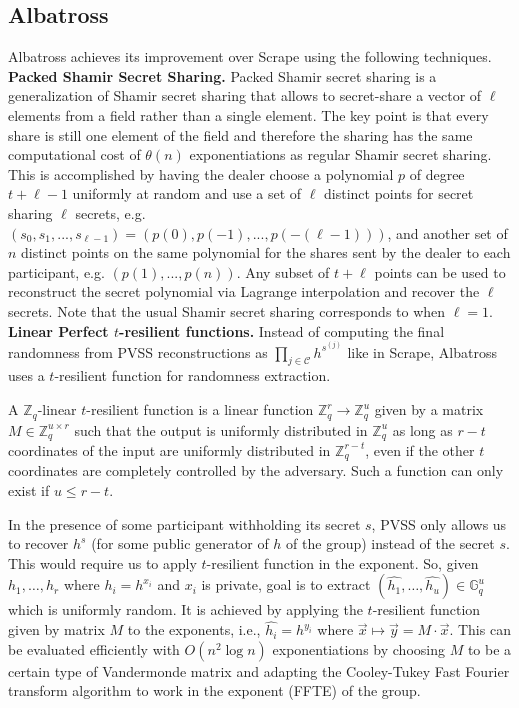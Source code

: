 \documentclass[letterpaper,twocolumn,10pt]{article}
\theoremstyle{definition}
\theoremstyle{remark}
\begin{document}
\iffalse
\subsection{Albatross}
\label{appendix:albatross}
Albatross \cite{cascudo2020albatross} achieves its improvement over Scrape using the following techniques.\\

\noindent\textbf{Packed Shamir Secret Sharing.} Packed Shamir secret sharing is a generalization of Shamir secret sharing that allows to secret-share a vector of $\ell$ elements from a field rather than a single element. The key point is that every share is still one element of the field and therefore the sharing has the same computational cost of $\theta(n)$ exponentiations as regular Shamir secret sharing. This is accomplished by having the dealer choose a polynomial $p$ of degree $t+\ell-1$ uniformly at random and use a set of $\ell$ distinct points for secret sharing $\ell$ secrets, e.g. $(s_0, s_1, ..., s_{\ell - 1}) = (p(0), p(-1), ..., p(-(\ell - 1)))$, and another set of $n$ distinct points on the same polynomial for the shares sent by the dealer to each participant, e.g. $(p(1), ..., p(n))$. Any subset of $t+\ell$ points can be used to reconstruct the secret polynomial via Lagrange interpolation and recover the $\ell$ secrets. Note that the usual Shamir secret sharing corresponds to when $\ell = 1$.\\

\noindent\textbf{Linear Perfect $t$-resilient functions.} Instead of computing the final randomness from PVSS reconstructions as $\prod_{j \in \mathcal{C}} h^{s^{(j)}}$ like in Scrape, Albatross uses a $t$-resilient function for randomness extraction.

A $\mathbb{Z}_q$-linear $t$-resilient function is a linear function $\mathbb{Z}_q^r \rightarrow \mathbb{Z}_q^u$ given by a matrix $M \in \mathbb{Z}_q^{u \times r}$ such that the output is uniformly distributed in $\mathbb{Z}_q^u$ as long as $r-t$ coordinates of the input are uniformly distributed in $\mathbb{Z}_q^{r-t}$, even if the other $t$ coordinates are completely controlled by the adversary. Such a function can only exist if $u \le r-t$.

In the presence of some participant withholding its secret $s$, PVSS only allows us to recover $h^s$ (for some public generator of $h$ of the group) instead of the secret $s$. This would require us to apply $t$-resilient function in the exponent. So, given $h_1, \ldots, h_r$ where $h_i = h^{x_i}$ and $x_i$ is private, goal is to extract $(\hat{h_1},\ldots, \hat{h_u}) \in \mathbb{G}_q^u$ which is uniformly random. It is achieved by applying the $t$-resilient function given by matrix $M$ to the exponents, i.e., $\hat{h_i} = h^{y_i}$ where $\vec{x} \mapsto \vec{y} = M \cdot \vec{x}$. This can be evaluated efficiently with $O(n^2 \log n)$ exponentiations by choosing $M$ to be a certain type of Vandermonde matrix and adapting the Cooley-Tukey Fast Fourier transform algorithm to work in the exponent (FFTE) \cite{cascudo2020albatross} of the group.
\end{document}
